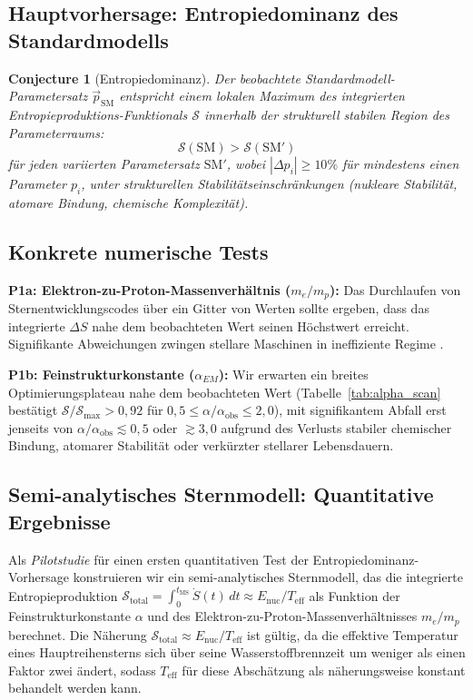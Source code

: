 \documentclass[12pt,a4paper]{article}
\newtheorem{conjecture}{Conjecture}
\theoremstyle{remark}
\begin{document}
\subsection{Hauptvorhersage: Entropiedominanz des Standardmodells}

\begin{conjecture}[Entropiedominanz]
\label{conj:entropy-dominance}
Der beobachtete Standardmodell-Parametersatz $\vec{p}_{\mathrm{SM}}$ entspricht einem lokalen Maximum des integrierten Entropieproduktions-Funktionals $\mathcal{S}$ innerhalb der strukturell stabilen Region des Parameterraums:
\begin{equation}
\mathcal{S}(\mathrm{SM}) > \mathcal{S}(\mathrm{SM}')
\end{equation}
f\"ur jeden variierten Parametersatz $\mathrm{SM}'$, wobei $|\Delta p_i| \geq 10\%$ f\"ur mindestens einen Parameter $p_i$, unter strukturellen Stabilit\"atseinschr\"ankungen (nukleare Stabilit\"at, atomare Bindung, chemische Komplexit\"at).
\end{conjecture}

\subsection{Konkrete numerische Tests}

\textbf{P1a: Elektron-zu-Proton-Massenverh\"altnis ($m_e/m_p$):} Das Durchlaufen von Sternentwicklungscodes \"uber ein Gitter von Werten sollte ergeben, dass das integrierte $\Delta S$ nahe dem beobachteten Wert seinen H\"ochstwert erreicht. Signifikante Abweichungen zwingen stellare Maschinen in ineffiziente Regime \citep{Adams2019}.

\textbf{P1b: Feinstrukturkonstante ($\alpha_{EM}$):} Wir erwarten ein breites Optimierungsplateau nahe dem beobachteten Wert (Tabelle~\ref{tab:alpha_scan} best\"atigt $\mathcal{S}/\mathcal{S}_{\max} > 0{,}92$ f\"ur $0{,}5 \leq \alpha/\alpha_{\text{obs}} \leq 2{,}0$), mit signifikantem Abfall erst jenseits von $\alpha/\alpha_{\text{obs}} \lesssim 0{,}5$ oder $\gtrsim 3{,}0$ aufgrund des Verlusts stabiler chemischer Bindung, atomarer Stabilit\"at oder verk\"urzter stellarer Lebensdauern.

\subsection{Semi-analytisches Sternmodell: Quantitative Ergebnisse}
\label{sec:stellar_model}

Als \emph{Pilotstudie} f\"ur einen ersten quantitativen Test der Entropiedominanz-Vorhersage konstruieren wir ein semi-analytisches Sternmodell, das die integrierte Entropieproduktion $\mathcal{S}_{\text{total}} = \int_0^{t_{\text{MS}}} \dot{S}(t)\,dt \approx E_{\text{nuc}} / T_{\text{eff}}$ als Funktion der Feinstrukturkonstante $\alpha$ und des Elektron-zu-Proton-Massenverh\"altnisses $m_e/m_p$ berechnet. Die N\"aherung $\mathcal{S}_{\text{total}} \approx E_{\text{nuc}} / T_{\text{eff}}$ ist g\"ultig, da die effektive Temperatur eines Hauptreihensterns sich \"uber seine Wasserstoffbrennzeit um weniger als einen Faktor zwei \"andert, sodass $T_{\text{eff}}$ f\"ur diese Absch\"atzung als n\"aherungsweise konstant behandelt werden kann.
\end{document}
